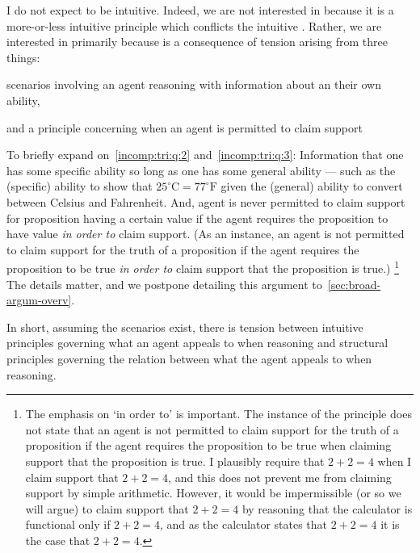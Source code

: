 \begin{note}
  I do not expect \EAS{} to be intuitive.
  Indeed, we are not interested in \EAS{} because it is a more-or-less intuitive principle which conflicts the intuitive \ESU{}.
  Rather, we are interested in \EAS{} primarily because \EAS{} is a consequence of tension arising from three things:
  \begin{enumerate*}
  \item\label{incomp:tri:q:1} \ESU{}
  \item\label{incomp:tri:q:2} scenarios involving an agent reasoning with information about an their own ability,
  \item\label{incomp:tri:q:3} and a principle concerning when an agent is permitted to claim support
  \end{enumerate*}
  To briefly expand on~\ref{incomp:tri:q:2} and~\ref{incomp:tri:q:3}:
  Information that one has some specific ability so long as one has some general ability --- such as the (specific) ability to show that \(25^{\circ}\text{C} = 77^{\circ}\text{F}\) given the (general) ability to convert between Celsius and Fahrenheit.
  And, agent is never permitted to claim support for proposition having a certain value if the agent requires the proposition to have value \emph{in order to} claim support.
  (As an instance, an agent is not permitted to claim support for the truth of a proposition if the agent requires the proposition to be true \emph{in order to} claim support that the proposition is true.)\nolinebreak
  \footnote{
    The emphasis on `in order to' is important.
    The instance of the principle does not state that an agent is not permitted to claim support for the truth of a proposition if the agent requires the proposition to be true when claiming support that the proposition is true.
    I plausibly require that \(2 + 2 = 4\) when I claim support that \(2 + 2 = 4\), and this does not prevent me from claiming support by simple arithmetic.
    However, it would be impermissible (or so we will argue) to claim support that \(2 + 2 = 4\) by reasoning that the calculator is functional only if \(2 + 2 = 4\), and as the calculator states that \(2 + 2 = 4\) it is the case that \(2 + 2 = 4\).
  }
  The details matter, and we postpone detailing this argument to~\autoref{sec:broad-argum-overv}.

  In short, assuming the scenarios exist, there is tension between intuitive principles governing what an agent appeals to when reasoning and structural principles governing the relation between what the agent appeals to when reasoning.
\end{note}

